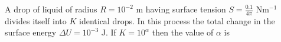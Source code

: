 
    \item A drop of liquid of radius \( R = 10^{-2} \) m having surface tension \( S = \frac{0.1}{4\pi} \) Nm\(^{-1}\) divides itself into \( K \) identical drops. In this process the total change in the surface energy \( \Delta U = 10^{-3} \) J. If \( K = 10^\alpha \) then the value of \( \alpha \) is
